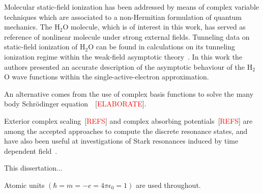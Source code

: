  


Molecular static-field ionization has been addressed by means of
complex variable techniques which are associated to a non-Hermitian
formulation of quantum mechanics. The H$_{2}$O molecule, which is of
interest in this work, has served as reference of nonlinear molecule
under strong external fields. Tunneling data on static-field
ionization of H$_{2}$O can be found in calculations on its tunneling
ionization regime within the weak-field asymptotic
theory~\cite{Toru_weakF_H2O,Toru_weakF_molec}. In this work the
authors presented an accurate description of the asymptotic behaviour
of the H$_{2}$O wave functions within the single-active-electron
approximation.




An alternative comes from the use of complex basis functions to solve
the many body Schr\"{o}dinger
equation~\cite{Jagau_manybody_H2O}~[\textcolor{red}{ELABORATE}].




Exterior complex scaling~[\textcolor{red}{REFS}] and complex absorbing
potentials~[\textcolor{red}{REFS}] are among the accepted approaches
to compute the discrete resonance states, and have also been useful at
investigations of Stark resonances induced by time dependent
field~\cite{ecsScrinzi,Krause_2014}.







This dissertation...

Atomic units $(\hbar = m = -e = 4\pi\epsilon_{0} = 1)$ are used
throughout.
































